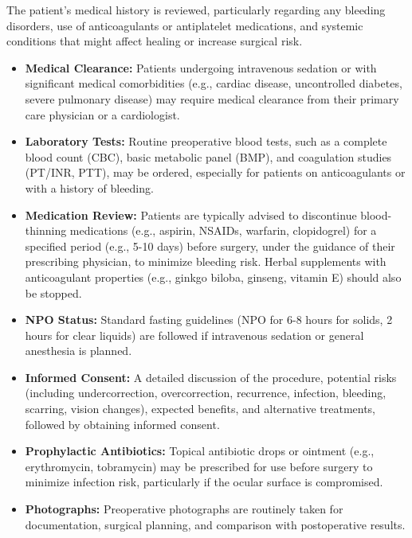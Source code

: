 The patient's medical history is reviewed, particularly regarding any bleeding disorders, use of anticoagulants or antiplatelet medications, and systemic conditions that might affect healing or increase surgical risk.

\begin{itemize}
  \item \textbf{Medical Clearance:} Patients undergoing intravenous sedation or with significant medical comorbidities (e.g., cardiac disease, uncontrolled diabetes, severe pulmonary disease) may require medical clearance from their primary care physician or a cardiologist.

  \item \textbf{Laboratory Tests:} Routine preoperative blood tests, such as a complete blood count (CBC), basic metabolic panel (BMP), and coagulation studies (PT/INR, PTT), may be ordered, especially for patients on anticoagulants or with a history of bleeding.

  \item \textbf{Medication Review:} Patients are typically advised to discontinue blood-thinning medications (e.g., aspirin, NSAIDs, warfarin, clopidogrel) for a specified period (e.g., 5-10 days) before surgery, under the guidance of their prescribing physician, to minimize bleeding risk. Herbal supplements with anticoagulant properties (e.g., ginkgo biloba, ginseng, vitamin E) should also be stopped.

  \item \textbf{NPO Status:} Standard fasting guidelines (NPO for 6-8 hours for solids, 2 hours for clear liquids) are followed if intravenous sedation or general anesthesia is planned.

  \item \textbf{Informed Consent:} A detailed discussion of the procedure, potential risks (including undercorrection, overcorrection, recurrence, infection, bleeding, scarring, vision changes), expected benefits, and alternative treatments, followed by obtaining informed consent.

  \item \textbf{Prophylactic Antibiotics:} Topical antibiotic drops or ointment (e.g., erythromycin, tobramycin) may be prescribed for use before surgery to minimize infection risk, particularly if the ocular surface is compromised.

  \item \textbf{Photographs:} Preoperative photographs are routinely taken for documentation, surgical planning, and comparison with postoperative results.
\end{itemize}

